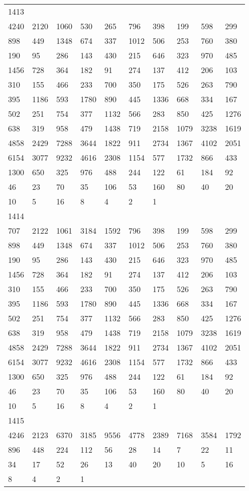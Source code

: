 \begin{longtable}{*{10}{l}}
1413&&&&&&&&&\\
4240& 2120& 1060& 530& 265& 796& 398& 199& 598& 299\\
898& 449& 1348& 674& 337& 1012& 506& 253& 760& 380\\
190& 95& 286& 143& 430& 215& 646& 323& 970& 485\\
1456& 728& 364& 182& 91& 274& 137& 412& 206& 103\\
310& 155& 466& 233& 700& 350& 175& 526& 263& 790\\
395& 1186& 593& 1780& 890& 445& 1336& 668& 334& 167\\
502& 251& 754& 377& 1132& 566& 283& 850& 425& 1276\\
638& 319& 958& 479& 1438& 719& 2158& 1079& 3238& 1619\\
4858& 2429& 7288& 3644& 1822& 911& 2734& 1367& 4102& 2051\\
6154& 3077& 9232& 4616& 2308& 1154& 577& 1732& 866& 433\\
1300& 650& 325& 976& 488& 244& 122& 61& 184& 92\\
46& 23& 70& 35& 106& 53& 160& 80& 40& 20\\
10& 5& 16& 8& 4& 2& 1& \\

1414&&&&&&&&&\\
707& 2122& 1061& 3184& 1592& 796& 398& 199& 598& 299\\
898& 449& 1348& 674& 337& 1012& 506& 253& 760& 380\\
190& 95& 286& 143& 430& 215& 646& 323& 970& 485\\
1456& 728& 364& 182& 91& 274& 137& 412& 206& 103\\
310& 155& 466& 233& 700& 350& 175& 526& 263& 790\\
395& 1186& 593& 1780& 890& 445& 1336& 668& 334& 167\\
502& 251& 754& 377& 1132& 566& 283& 850& 425& 1276\\
638& 319& 958& 479& 1438& 719& 2158& 1079& 3238& 1619\\
4858& 2429& 7288& 3644& 1822& 911& 2734& 1367& 4102& 2051\\
6154& 3077& 9232& 4616& 2308& 1154& 577& 1732& 866& 433\\
1300& 650& 325& 976& 488& 244& 122& 61& 184& 92\\
46& 23& 70& 35& 106& 53& 160& 80& 40& 20\\
10& 5& 16& 8& 4& 2& 1& \\

1415&&&&&&&&&\\
4246& 2123& 6370& 3185& 9556& 4778& 2389& 7168& 3584& 1792\\
896& 448& 224& 112& 56& 28& 14& 7& 22& 11\\
34& 17& 52& 26& 13& 40& 20& 10& 5& 16\\
8& 4& 2& 1& \\


\end{longtable}
